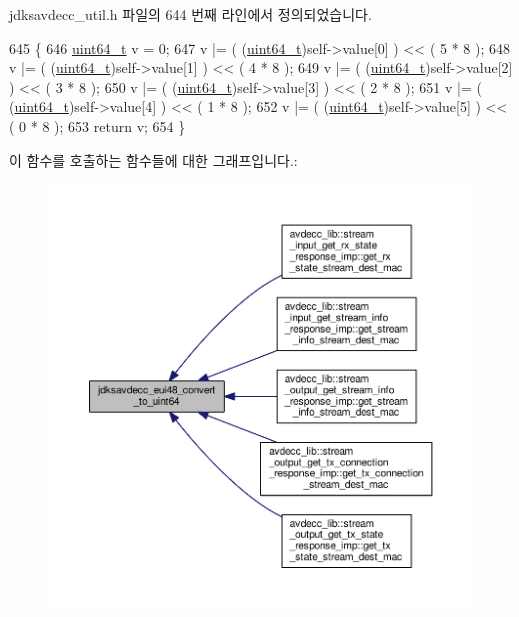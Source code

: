 jdksavdecc\+\_\+util.\+h 파일의 644 번째 라인에서 정의되었습니다.


\begin{DoxyCode}
645 \{
646     \hyperlink{parse_8c_aec6fcb673ff035718c238c8c9d544c47}{uint64\_t} v = 0;
647     v |= ( (\hyperlink{parse_8c_aec6fcb673ff035718c238c8c9d544c47}{uint64\_t})self->value[0] ) << ( 5 * 8 );
648     v |= ( (\hyperlink{parse_8c_aec6fcb673ff035718c238c8c9d544c47}{uint64\_t})self->value[1] ) << ( 4 * 8 );
649     v |= ( (\hyperlink{parse_8c_aec6fcb673ff035718c238c8c9d544c47}{uint64\_t})self->value[2] ) << ( 3 * 8 );
650     v |= ( (\hyperlink{parse_8c_aec6fcb673ff035718c238c8c9d544c47}{uint64\_t})self->value[3] ) << ( 2 * 8 );
651     v |= ( (\hyperlink{parse_8c_aec6fcb673ff035718c238c8c9d544c47}{uint64\_t})self->value[4] ) << ( 1 * 8 );
652     v |= ( (\hyperlink{parse_8c_aec6fcb673ff035718c238c8c9d544c47}{uint64\_t})self->value[5] ) << ( 0 * 8 );
653     \textcolor{keywordflow}{return} v;
654 \}
\end{DoxyCode}


이 함수를 호출하는 함수들에 대한 그래프입니다.\+:
\nopagebreak
\begin{figure}[H]
\begin{center}
\leavevmode
\includegraphics[width=350pt]{group__eui48_ga78571c7205584f7ebeee362eb97d57eb_icgraph}
\end{center}
\end{figure}


